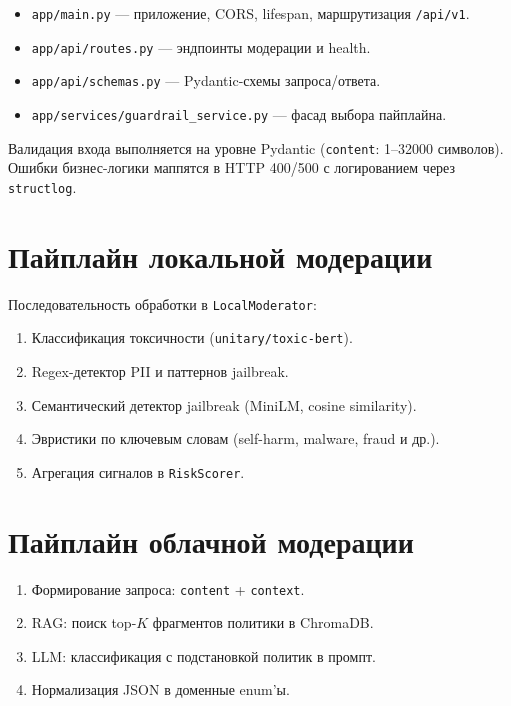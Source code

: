 \documentclass[12pt,a4paper]{report}
\begin{document}
\begin{itemize}
    \item \texttt{app/main.py} --- приложение, CORS, lifespan, маршрутизация \texttt{/api/v1}.
    \item \texttt{app/api/routes.py} --- эндпоинты модерации и health.
    \item \texttt{app/api/schemas.py} --- Pydantic-схемы запроса/ответа.
    \item \texttt{app/services/guardrail\_service.py} --- фасад выбора пайплайна.
\end{itemize}

Валидация входа выполняется на уровне Pydantic (\texttt{content}: 1--32000 символов).
Ошибки бизнес-логики маппятся в HTTP 400/500 с логированием через \texttt{structlog}.

\section{Пайплайн локальной модерации}

Последовательность обработки в \texttt{LocalModerator}:

\begin{enumerate}
    \item Классификация токсичности (\texttt{unitary/toxic-bert}).
    \item Regex-детектор PII и паттернов jailbreak.
    \item Семантический детектор jailbreak (MiniLM, cosine similarity).
    \item Эвристики по ключевым словам (self-harm, malware, fraud и др.).
    \item Агрегация сигналов в \texttt{RiskScorer}.
\end{enumerate}

\section{Пайплайн облачной модерации}

\begin{enumerate}
    \item Формирование запроса: \texttt{content} + \texttt{context}.
    \item RAG: поиск top-$K$ фрагментов политики в ChromaDB.
    \item LLM: классификация с подстановкой политик в промпт.
    \item Нормализация JSON в доменные enum'ы.
\end{enumerate}
\end{document}
